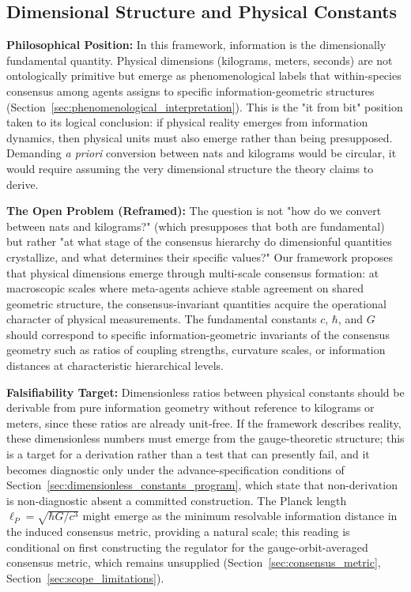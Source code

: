 \documentclass[11pt]{article}
\begin{document}
\subsection{Dimensional Structure and Physical Constants}
\label{sec:dimensional_structure}

\textbf{Philosophical Position:} In this framework, information is the dimensionally fundamental quantity. Physical dimensions (kilograms, meters, seconds) are not ontologically primitive but emerge as phenomenological labels that within-species consensus among agents assigns to specific information-geometric structures (Section~\ref{sec:phenomenological_interpretation}). This is the "it from bit" position taken to its logical conclusion: if physical reality emerges from information dynamics, then physical units must also emerge rather than being presupposed. Demanding \emph{a priori} conversion between nats and kilograms would be circular, it would require assuming the very dimensional structure the theory claims to derive.

\textbf{The Open Problem (Reframed):} The question is not "how do we convert between nats and kilograms?" (which presupposes that both are fundamental) but rather "at what stage of the consensus hierarchy do dimensionful quantities crystallize, and what determines their specific values?" Our framework proposes that physical dimensions emerge through multi-scale consensus formation: at macroscopic scales where meta-agents achieve stable agreement on shared geometric structure, the consensus-invariant quantities acquire the operational character of physical measurements. The fundamental constants $c$, $\hbar$, and $G$ should correspond to specific information-geometric invariants of the consensus geometry such as ratios of coupling strengths, curvature scales, or information distances at characteristic hierarchical levels.

\textbf{Falsifiability Target:} Dimensionless ratios between physical constants should be derivable from pure information geometry without reference to kilograms or meters, since these ratios are already unit-free. If the framework describes reality, these dimensionless numbers must emerge from the gauge-theoretic structure; this is a target for a derivation rather than a test that can presently fail, and it becomes diagnostic only under the advance-specification conditions of Section~\ref{sec:dimensionless_constants_program}, which state that non-derivation is non-diagnostic absent a committed construction. The Planck length $\ell_P = \sqrt{\hbar G/c^3}$ might emerge as the minimum resolvable information distance in the induced consensus metric, providing a natural scale; this reading is conditional on first constructing the regulator for the gauge-orbit-averaged consensus metric, which remains unsupplied (Section~\ref{sec:consensus_metric}, Section~\ref{sec:scope_limitations}).
\end{document}
